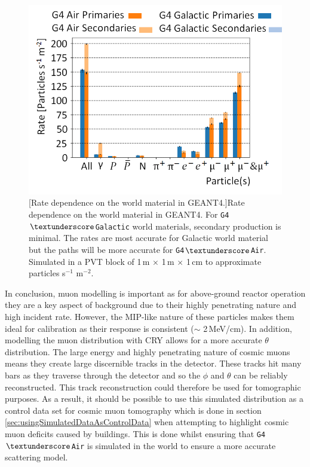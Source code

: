 \begin{figure}[!h]
 \centering
 \includegraphics[width=0.7\linewidth]{Chapter4/Figs/Raster/CryPlots/CRY_ratesMedText.png}
 [Rate dependence on the world material in GEANT4.]{Rate dependence on the world material in GEANT4. For \texttt{G4$\textunderscore$Galactic} world materials, secondary production is minimal. The rates are most accurate for Galactic world material but the paths will be more accurate for \texttt{G4$\textunderscore$Air}. Simulated in a PVT block of 1\,m $\times$ 1\,m $\times$ 1\,cm to approximate particles s$^{-1}$ m$^{-2}$.} 
 \label{fig:CRY_rates}
\end{figure}

In conclusion, muon modelling is important as for above-ground reactor operation they are a key aspect of background due to their highly penetrating nature and high incident rate. However, the MIP-like nature of these particles makes them ideal for calibration as their response is consistent ($\sim$ 2\,MeV/cm). In addition, modelling the muon distribution with CRY \cite{ieee_cry_2007} allows for a more accurate $\theta$ distribution. The large energy and highly penetrating nature of cosmic muons means they create large discernible tracks in the detector. These tracks hit many bars as they traverse through the detector and so the $\phi$ and $\theta$ can be reliably reconstructed. This track reconstruction could therefore be used for tomographic purposes. As a result, it should be possible to use this simulated distribution as a control data set for cosmic muon tomography which is done in section \ref{sec:usingSimulatedDataAsControlData} when attempting to highlight cosmic muon deficits caused by buildings. This is done whilst ensuring that \texttt{G4$\textunderscore$Air} is simulated in the world to ensure a more accurate scattering model. 

